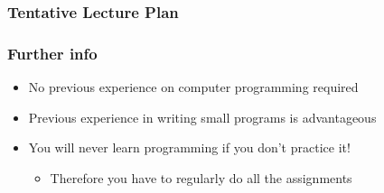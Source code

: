 \documentclass{beamer}%
\begin{document}
\begin{frame}
  \frametitle{Tentative Lecture Plan}
  \centering
    
\end{frame}


%  


\begin{frame}
\frametitle{Further info}
\begin{itemize}
\item No previous experience on computer programming required
\item Previous experience in writing small programs is advantageous
\pause
\item You will never learn  programming if you don't practice it!
\begin{itemize}
\item \color{red}Therefore you have to regularly do all the assignments
\end{itemize}
\end{itemize}
\end{frame}
\end{document}
